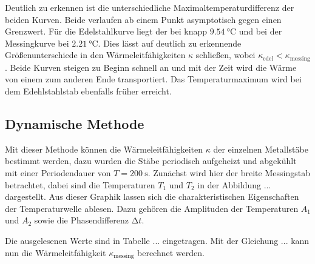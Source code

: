 Deutlich zu erkennen ist die unterschiedliche Maximaltemperaturdifferenz der beiden Kurven. Beide verlaufen ab einem Punkt asymptotisch gegen einen Grenzwert. Für die Edelstahlkurve liegt der bei knapp $\SI{9.54}{\celsius}$ und bei der 
Messingkurve bei $\SI{2.21}{\celsius}$. Dies lässt auf deutlich zu erkennende Größenunterschiede in den Wärmeleitfähigkeiten $\kappa$ schließen, wobei $\kappa_{\text{edel}} < \kappa_{\text{messing}}$. Beide Kurven steigen zu
Beginn schnell an und mit der Zeit wird die Wärme von einem zum anderen Ende transportiert. Das Temperaturmaximum wird bei dem Edehlstahlstab ebenfalls früher erreicht.

\subsection{Dynamische Methode}
Mit dieser Methode können die Wärmeleitfähigkeiten $\kappa$ der einzelnen Metallstäbe bestimmt werden, dazu wurden die Stäbe periodisch aufgeheizt und abgekühlt mit einer Periodendauer von $T = \SI{200}{\second}$.
Zunächst wird hier der breite Messingstab betrachtet, dabei sind die Temperaturen $T_{1}$ und $T_{2}$ in der Abbildung ... dargestellt. Aus dieser Graphik lassen sich die charakteristischen Eigenschaften der Temperaturwelle
ablesen. Dazu gehören die Amplituden der Temperaturen $A_{1}$ und $A_{2}$ sowie die Phasendifferenz $\increment t$. 




Die ausgelesenen Werte sind in Tabelle ... eingetragen. Mit der Gleichung ...
kann nun die Wärmeleitfähigkeit $\kappa_{\text{messing}}$ berechnet werden.